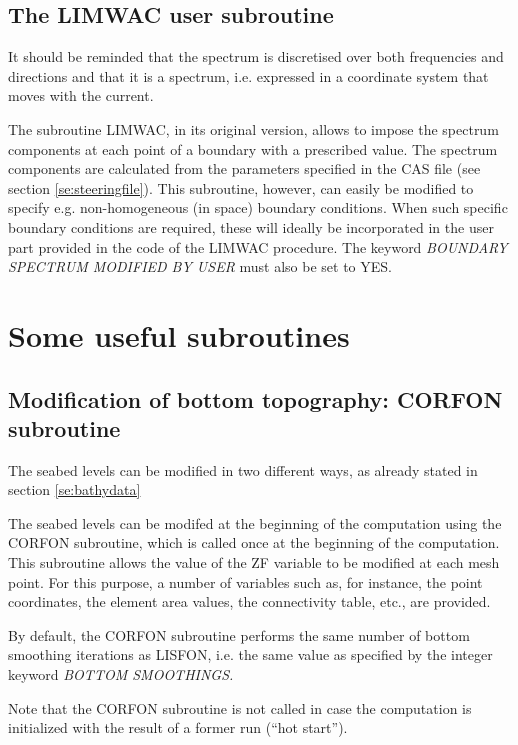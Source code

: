 \subsection{ The LIMWAC user subroutine}

 It should be reminded that the spectrum is discretised over both frequencies and directions and that it is a  spectrum, i.e. expressed in a coordinate system that moves with the current.

 The subroutine LIMWAC, in its original version, allows to impose the spectrum components at each point of a boundary with a prescribed value. The spectrum components are calculated from the parameters specified in the CAS file (see section \ref{se:steeringfile}). This subroutine, however, can easily be modified to specify e.g. non-homogeneous (in space) boundary conditions. When such specific boundary conditions are required, these will ideally be incorporated in the user part provided in the code of the LIMWAC procedure. The keyword \textit{BOUNDARY SPECTRUM MODIFIED BY USER} must also be set to YES.


\section{ Some useful subroutines}


\subsection{ Modification of bottom topography: CORFON subroutine}
\label{se:corfon}
 The seabed levels can be modified in two different ways, as already stated in section \ref{se:bathydata}

 The seabed levels can be modifed at the beginning of the computation using the CORFON subroutine, which is called once at the beginning of the computation. This subroutine allows the value of the ZF variable to be modified at each mesh point. For this purpose, a number of variables such as, for instance, the point coordinates, the element area values, the connectivity table, etc., are provided.

 By default, the CORFON subroutine performs the same number of bottom smoothing iterations as LISFON, i.e. the same value as specified by the integer keyword \textit{BOTTOM SMOOTHINGS.}

 Note that the CORFON subroutine is not called in case the computation is initialized with the result of a former \tomawac run (``hot start'').

